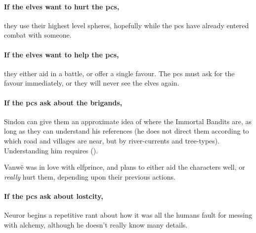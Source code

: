 \paragraph{If the elves want to hurt the \glspl{pc},}
they use their highest level spheres, hopefully while the \glspl{pc} have already entered combat with someone.

\paragraph{If the elves want to help the \glspl{pc},}
they either aid in a battle, or offer a single favour.
The \glspl{pc} must ask for the favour immediately, or they will never see the elves again.


\paragraph{If the \glspl{pc} ask about the brigands,}
Sindon can give them an approximate idea of where the Immortal Bandits are, as long as they can understand his references (he does not direct them according to which road and \glspl{village} are near, but by river-currents and tree-types).
Understanding him requires  (\tn[10]).


Vanw\"e was in love with \gls{elfprince}, and plans to either aid the characters well, or \emph{really} hurt them, depending upon their previous actions.

\label{neuror}

\paragraph{If the \glspl{pc} ask about \gls{lostcity},}
Neuror begins a repetitive rant about how it was all the humans fault for messing with alchemy, although he doesn't really know many details.

